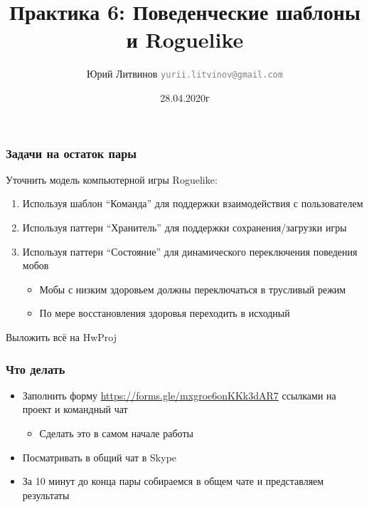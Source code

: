 \documentclass[xetex,mathserif,serif]{beamer}
\title{Практика 6: Поведенческие шаблоны и Roguelike}
\author[Юрий Литвинов]{Юрий Литвинов \newline \textcolor{gray}{\small\texttt{yurii.litvinov@gmail.com}}}
\date{28.04.2020г}
\begin{document}
    
    \frame{\titlepage}

    \begin{frame}
        \frametitle{Задачи на остаток пары}
        Уточнить модель компьютерной игры Roguelike:

        \begin{enumerate}
            \item Используя шаблон ``Команда'' для поддержки взаимодействия с пользователем
            \item Используя паттерн ``Хранитель'' для поддержки сохранения/загрузки игры
            \item Используя паттерн ``Состояние'' для динамического переключения поведения мобов
            \begin{itemize}
                \item Мобы с низким здоровьем должны переключаться в трусливый режим
                \item По мере восстановления здоровья переходить в исходный
            \end{itemize}
        \end{enumerate}

        Выложить всё на HwProj
    \end{frame}

    \begin{frame}
        \frametitle{Что делать}
        \begin{itemize}
            \item Заполнить форму \url{https://forms.gle/mxgroe6onKKk3dAR7} ссылками на проект и командный чат
            \begin{itemize}
                \item Сделать это в самом начале работы
            \end{itemize}
            \item Посматривать в общий чат в Skype
            \item За 10 минут до конца пары собираемся в общем чате и представляем результаты
        \end{itemize}
    \end{frame}
\end{document}
